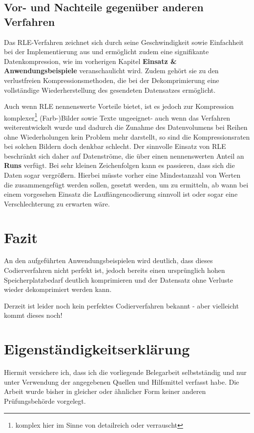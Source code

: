 \documentclass[11pt,a4paper,ngerman]{report}
\begin{document}
 		\section{Vor- und Nachteile gegenüber anderen Verfahren}
 		
 		Das RLE-Verfahren zeichnet sich durch seine Geschwindigkeit sowie Einfachheit bei der Implementierung aus und ermöglicht zudem  eine signifikante Datenkompression, wie im vorherigen Kapitel \textbf{Einsatz \& Anwendungsbeispiele} veranschaulicht wird. Zudem gehört sie zu den verlustfreien Kompressionsmethoden, die bei der Dekomprimierung eine vollständige Wiederherstellung des gesendeten Datensatzes ermöglicht.
 		
 		Auch wenn RLE nennenswerte Vorteile bietet, ist es jedoch zur Kompression komplexer\footnote{komplex hier im Sinne von detailreich oder verrauscht} (Farb-)Bilder sowie Texte ungeeignet- auch wenn das Verfahren weiterentwickelt wurde und dadurch die Zunahme des Datenvolumens bei Reihen ohne Wiederholungen kein Problem mehr darstellt, so sind die Kompressionsraten bei solchen Bildern doch denkbar schlecht. \cite{Koeck2006} Der sinnvolle Einsatz von RLE beschränkt sich daher auf Datenströme, die über einen nennenswerten Anteil an \textbf{Runs} verfügt.	Bei sehr kleinen Zeichenfolgen kann es passieren, dass sich die Daten sogar vergrößern. Hierbei müsste vorher eine Mindestanzahl von Werten die zusammengefügt werden sollen, gesetzt werden, um zu ermitteln, ab wann  bei einem vorgesehen Einsatz die Lauflängencodierung sinnvoll ist oder sogar eine Verschlechterung zu erwarten wäre.
		
	
	
	
	\chapter{Fazit}
	An den aufgeführten Anwendungsbeispielen wird deutlich, dass dieses Codierverfahren nicht perfekt ist, jedoch bereits einen ursprünglich hohen Speicherplatzbedarf deutlich komprimieren  und der Datensatz ohne Verluste wieder dekomprimiert werden kann.
	
	Derzeit ist leider noch kein perfektes Codierverfahren bekannt - aber vielleicht kommt dieses noch!
	
	\chapter{Eigenständigkeitserklärung}
	
	Hiermit versichere ich, dass ich die vorliegende Belegarbeit selbstständig und nur unter
	Verwendung der angegebenen Quellen und Hilfsmittel verfasst habe. Die Arbeit wurde bisher
	in gleicher oder ähnlicher Form keiner anderen Prüfungsbehörde vorgelegt.
	
\end{document}

